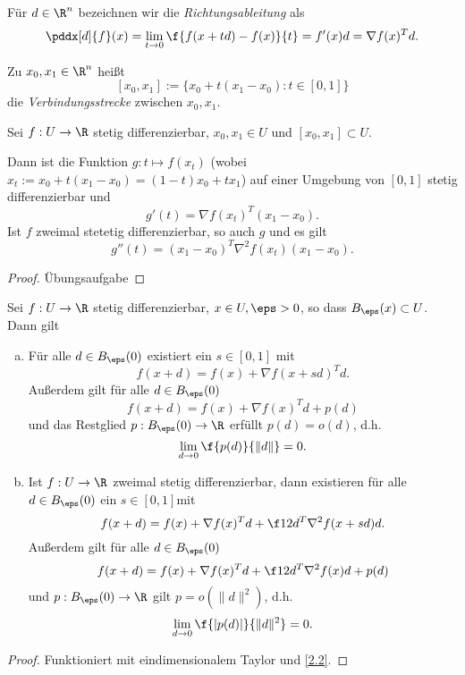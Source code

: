 Für $d \in \R^n$ bezeichnen wir die \emph{Richtungsableitung} als
\[
	\pddx[d]{f}(x)
	= \lim_{t\to 0} \f {f(x+td) - f(x)}{t}
	= f'(x) d = \nabla f(x)^T d.
\]

\begin{df} \label{2.1}
	Zu $x_0,x_1 \in \R^n$ heißt
	\[
		[x_0, x_1] := \{ x_0 + t(x_1-x_0) : t \in [0,1] \}
	\]
	die \emph{Verbindungsstrecke} zwischen $x_0, x_1$.
\end{df}

\begin{st} \label{2.2}
	Sei $f: U \to \R$ stetig differenzierbar, $x_0, x_1 \in U$ und $[x_0, x_1] \subset U$.

	Dann ist die Funktion $g: t \mapsto f(x_t)$ (wobei $x_t := x_0 + t(x_1 - x_0) = (1-t) x_0 + tx_1$) auf einer Umgebung von $[0,1]$ stetig differenzierbar und
	\[
		g'(t) = \nabla f(x_t)^T (x_1 - x_0).
	\]
	Ist $f$ zweimal stetetig differenzierbar, so auch $g$ und es gilt
	\[
		g''(t) = (x_1 - x_0)^T \nabla^2 f(x_t) (x_1 - x_0).
	\]
	\begin{proof}
		Übungsaufgabe
	\end{proof}
\end{st}

\begin{st} \label{2.3}
	Sei $f : U \to \R$ stetig differenzierbar, $x\in U, \eps > 0$, so dass $B_\eps(x) \subset U$.
	Dann gilt
	\begin{enumerate}[(a)]
		\item
			Für alle $d \in B_\eps(0)$ existiert ein $s \in [0,1]$ mit
			\[
				f(x+d) = f(x) + \nabla f(x + sd)^T d.
			\]
			Außerdem gilt für alle $d \in B_\eps(0)$
			\[
				f(x+d) = f(x) + \nabla f(x)^T d + p(d)
			\]
			und das Restglied $p: B_\eps(0) \to \R$ erfüllt $p(d) = o(d)$, d.h.
			\[
				\lim_{d\to 0} \f {p(d)}{\|d\|} = 0.
			\]
		\item
			Ist $f: U \to \R$ zweimal stetig differenzierbar, dann existieren für alle $d \in B_\eps(0)$ ein $s \in [0,1]$mit
			\[
				f(x+d)
				= f(x) + \nabla f(x)^T d + \f 12 d^T \nabla^2 f(x+sd) d.
			\]
			Außerdem gilt für alle $d \in B_\eps(0)$
			\[
				f(x+d) = f(x) + \nabla f(x)^T d + \f 12 d^T \nabla^2 f(x) d + p(d)
			\]
			und $p: B_\eps(0) \to \R$ gilt $p = o(\|d\|^2)$, d.h.
			\[
				\lim_{d\to 0} \f{|p(d)|}{\|d\|^2} = 0.
			\]
	\end{enumerate}
	\begin{proof}
		Funktioniert mit eindimensionalem Taylor und \ref{2.2}.
	\end{proof}
\end{st}

